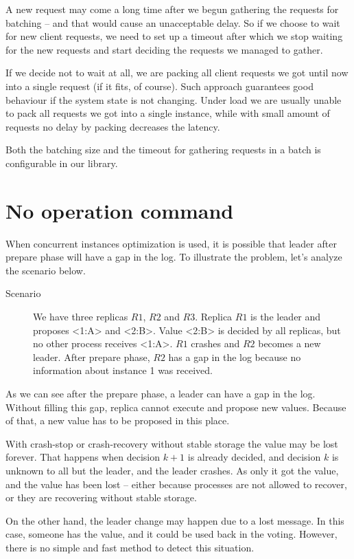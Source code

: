 A new request may come a long time after we begun gathering the requests for batching -- and that would cause an unacceptable delay. So if we choose to wait for new client requests, we need to set up a timeout after which we stop waiting for the new requests and start deciding the requests we managed to gather.

If we decide not to wait at all, we are packing all client requests we got until now into a single request (if it fits, of course). Such approach guarantees good behaviour if the system state is not changing. Under load  we are usually unable to pack all requests we got into a single instance, while with small amount of requests no delay by packing decreases the latency.

Both the batching size and the timeout for gathering requests in a batch is con\-figurable in our library.


\section{No operation command}

When concurrent instances optimization is used, it is possible that leader after prepare phase will have a gap in the log. To illustrate the problem, let's analyze the scenario below.

\begin{description}
  \item [Scenario] We have three replicas $R1$, $R2$ and $R3$. Replica $R1$ is the leader and proposes <1:A> and <2:B>. Value <2:B> is decided by all replicas, but no other process receives <1:A>. $R1$ crashes and $R2$ becomes a new leader. After prepare phase, $R2$ has a gap in the log because no information about instance 1 was received.
\end{description} 

As we can see after the prepare phase, a leader can have a gap in the log. Without filling this gap, replica cannot execute and propose new values. Because of that, a new value has to be proposed in this place.

With crash-stop or crash-recovery without stable storage the value may be lost forever. That happens when decision $k+1$ is already decided, and decision $k$ is unknown to all but the leader, and the leader crashes. As only it got the value, and the value has been lost -- either because processes are not allowed to recover, or they are recovering without stable storage.

On the other hand, the leader change may happen due to a lost \alive message. \linebreak In this case, someone has the value, and it could be used back in the voting. However, there is no simple and fast method to detect this situation.

